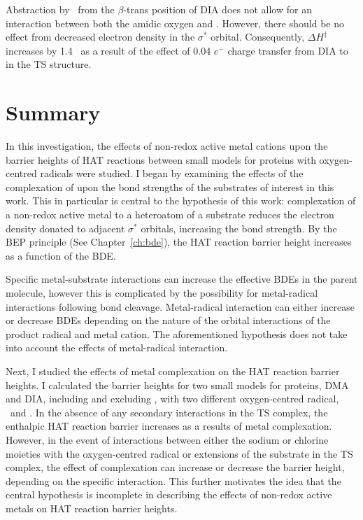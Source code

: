 \begin{doublespace}
Abstraction by \cumo\ from the $\beta$-trans position of DIA does not allow for
an interaction between both the amidic oxygen and \cumo. However, there should
be no effect from decreased electron density in the  $\sigma^*$ orbital.
Consequently, $\Delta H^\ddagger$ increases by 1.4 \kcalmol\ as a result of the
effect of 0.04 $e^-$ charge transfer from DIA to  in the TS structure.


\section{Summary}

In this investigation, the effects of non-redox active metal cations upon the
barrier heights of HAT reactions between small models for proteins with
oxygen-centred radicals were studied. I began by examining the effects of the
complexation of  upon the  bond strengths of the substrates of
interest in this work. This in particular is central to the hypothesis of this
work: complexation of a non-redox active metal to a heteroatom of a substrate
reduces the electron density donated to adjacent  $\sigma^*$ orbitals,
increasing the  bond strength. By the BEP principle (See
Chapter~\ref{ch:bde}), the HAT reaction barrier height increases as a function
of the  BDE.

Specific metal-substrate interactions can increase the effective  BDEs
in the parent molecule, however this is complicated by the possibility for
metal-radical interactions following bond cleavage. Metal-radical interaction
can either increase or decrease  BDEs depending on the nature of the
orbital interactions of the product radical and metal cation. The aforementioned
hypothesis does not take into account the effects of metal-radical interaction.

Next, I studied the effects of metal complexation on the HAT reaction barrier
heights. I calculated the barrier heights for two small models for proteins, DMA
and DIA, including and excluding , with two different oxygen-centred
radical, \bno\ and \cumo. In the absence of any secondary interactions in the TS
complex, the enthalpic HAT reaction barrier increases as a results of metal
complexation. However, in the event of interactions between either the sodium or
chlorine moieties with the oxygen-centred radical or extensions of the substrate
in the TS complex, the effect of complexation can increase or decrease the
barrier height, depending on the specific interaction. This further motivates
the idea that the central hypothesis is incomplete in describing the effects of
non-redox active metals on HAT reaction barrier heights.


\end{doublespace}
